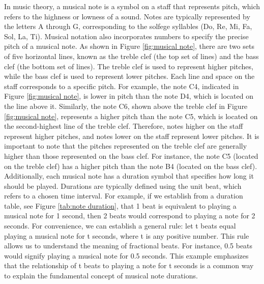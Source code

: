 \documentclass[11pt]{article}
\theoremstyle{definition}
\begin{document}
In music theory, a musical note is a symbol on a staff that represents pitch, which refers to the highness or lowness of a sound. Notes are typically represented by the letters A through G, corresponding to the solfege syllables (Do, Re, Mi, Fa, Sol, La, Ti). Musical notation also incorporates numbers to specify the precise pitch of a musical note. As shown in Figure \ref{fig:musical note}, there are two sets of five horizontal lines, known as the treble clef (the top set of lines) and the bass clef (the bottom set of lines).
The treble clef is used to represent higher pitches, while the bass clef is used to represent lower pitches. Each line and space on the staff corresponds to a specific pitch. For example, the note C4, indicated in Figure \ref{fig:musical note}, is lower in pitch than the note D4, which is located on the line above it.
Similarly, the note C6, shown above the treble clef in Figure \ref{fig:musical note}, represents a higher pitch than the note C5, which is located on the second-highest line of the treble clef. Therefore, notes higher on the staff represent higher pitches, and notes lower on the staff represent lower pitches.
It is important to note that the pitches represented on the treble clef are generally higher than those represented on the bass clef. For instance, the note C5 (located on the treble clef) has a higher pitch than the note B4 (located on the bass clef). 
Additionally, each musical note has a duration symbol that specifies how long it should be played. Durations are typically defined using the unit beat, which refers to a chosen time interval. For example, if we establish from a duration table, see Figure \ref{tab:note duration}, that 1 beat is equivalent to playing a musical note for 1 second, then 2 beats would correspond to playing a note for 2 seconds. For convenience, we can establish a general rule: let t beats equal playing a musical note for t seconds, where t is any positive number. This rule allows us to understand the meaning of fractional beats. For instance, 0.5 beats would signify playing a musical note for 0.5 seconds. This example emphasizes that the relationship of t beats to playing a note for t seconds is a common way to explain the fundamental concept of musical note durations. 
\end{document}
